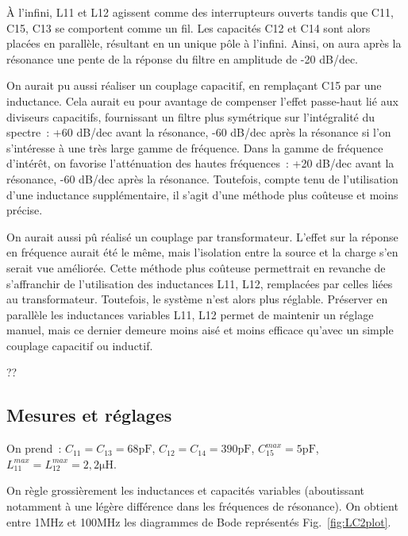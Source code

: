 \documentclass{article}
\begin{document}
À l'infini, L11 et L12 agissent comme des interrupteurs ouverts tandis que C11, C15, C13 se comportent comme un fil. Les capacités C12 et C14 sont alors placées en parallèle, résultant en un unique pôle à l'infini. Ainsi, on aura après la résonance une pente de la réponse du filtre en amplitude de -20 dB/dec.



On aurait pu aussi réaliser un couplage capacitif, en remplaçant C15 par une inductance. Cela aurait eu pour avantage de compenser l'effet passe-haut lié aux diviseurs capacitifs, fournissant un filtre plus symétrique sur l'intégralité du spectre~: +60 dB/dec avant la résonance, -60 dB/dec après la résonance si l'on s'intéresse à une très large gamme de fréquence. Dans la gamme de fréquence d'intérêt, on favorise l'atténuation des hautes fréquences~: +20 dB/dec avant la résonance, -60 dB/dec après la résonance. Toutefois, compte tenu de l'utilisation d'une inductance supplémentaire, il s'agit d'une méthode plus coûteuse et moins précise.

On aurait aussi pû réalisé un couplage par transformateur. L'effet sur la réponse en fréquence aurait été le même, mais l'isolation entre la source et la charge s'en serait vue améliorée. Cette méthode plus coûteuse permettrait en revanche de s'affranchir de l'utilisation des inductances L11, L12, remplacées par celles liées au transformateur. Toutefois, le système n'est alors plus réglable. Préserver en parallèle les inductances variables L11, L12 permet de maintenir un réglage manuel, mais ce dernier demeure moins aisé et moins efficace qu'avec un simple couplage capacitif ou inductif.




??


\subsection{Mesures et réglages}


On prend~: $C_{11}=C_{13}=68\mathrm{pF}$, $C_{12}=C_{14}=390\mathrm{pF}$, $C_{15}^{max}=5\mathrm{pF}$, $L_{11}^{max}=L_{12}^{max}=2,2\mathrm{\mu H}$.

On règle grossièrement les inductances et capacités variables (aboutissant notamment à une légère différence dans les fréquences de résonance). On obtient entre 1MHz et 100MHz les diagrammes de Bode représentés Fig.~\ref{fig:LC2plot}.
\end{document}
